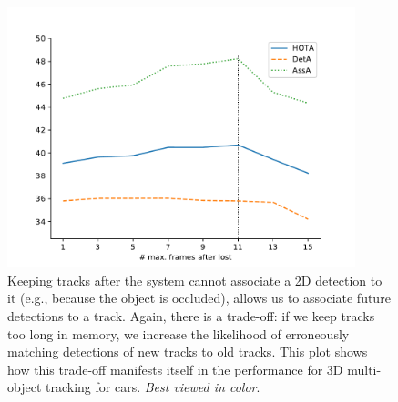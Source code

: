 \documentclass[headsepline, hidelinks, footsepline, footinclude=false, oneside, fontsize=11pt, paper=a4, listof=totoc, bibliography=totoc]{scrbook}
\begin{document}
\begin{figure}[htbp]
\centering
\includegraphics[width=0.9\textwidth]{figures/keep-track-plot.pdf}
\caption{\label{fig:keep-track-plot}Keeping tracks after the system cannot associate a 2D detection to it (e.g., because the object is occluded), allows us to associate future detections to a track. Again, there is a trade-off: if we keep tracks too long in memory, we increase the likelihood of erroneously matching detections of new tracks to old tracks. This plot shows how this trade-off manifests itself in the performance for 3D multi-object tracking for cars. \emph{Best viewed in color}.}
\end{figure}
\end{document}
